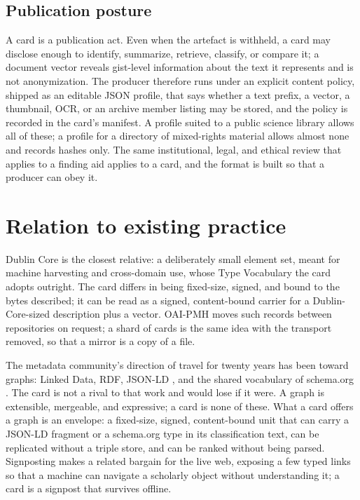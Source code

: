\documentclass[sigconf]{acmart}
\begin{document}
\subsection{Publication posture}

A card is a publication act. Even when the artefact is withheld, a card may
disclose enough to identify, summarize, retrieve, classify, or compare it; a
document vector reveals gist-level information about the text it represents
and is not anonymization. The producer therefore runs under an explicit
content policy, shipped as an editable JSON profile, that says whether a text
prefix, a vector, a thumbnail, OCR, or an archive member listing may be stored,
and the policy is recorded in the card's manifest. A profile suited to a public
science library allows all of these; a profile for a directory of mixed-rights
material allows almost none and records hashes only. The same institutional,
legal, and ethical review that applies to a finding aid applies to a card, and
the format is built so that a producer can obey it.

\section{Relation to existing practice}
\label{sec:related}

Dublin Core \cite{Kunze:2007} is the closest relative: a deliberately small
element set, meant for machine harvesting and cross-domain use, whose Type
Vocabulary the card adopts outright. The card differs in being fixed-size,
signed, and bound to the bytes described; it can be read as a signed,
content-bound carrier for a Dublin-Core-sized description plus a vector.
OAI-PMH \cite{Lagoze:2001} moves such records between repositories on request;
a shard of cards is the same idea with the transport removed, so that a mirror
is a copy of a file.

The metadata community's direction of travel for twenty years has been toward
graphs: Linked Data, RDF, JSON-LD \cite{Kellogg:2020}, and the shared
vocabulary of schema.org \cite{Guha:2016}. The card is not a rival to that
work and would lose if it were. A graph is extensible, mergeable, and
expressive; a card is none of these. What a card offers a graph is an
envelope: a fixed-size, signed, content-bound unit that can carry a JSON-LD
fragment or a schema.org type in its classification text, can be replicated
without a triple store, and can be ranked without being parsed. Signposting
\cite{VanDeSompel:2015} makes a related bargain for the live web, exposing a
few typed links so that a machine can navigate a scholarly object without
understanding it; a card is a signpost that survives offline.
\end{document}
